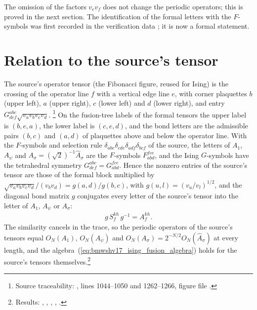 \documentclass{article}
\begin{document}
The omission of the factors $v_ev_f$ does not change the periodic
operators; this is proved in the next section. The identification of the
formal letters with the $F$-symbols was first recorded in the verification
data ; it is now
a formal statement.

\section{Relation to the source's tensor}

The source's operator tensor (the Fibonacci figure, reused for Ising) is the
crossing of the operator line $f$ with a vertical edge line $e$, with corner
plaquettes $b$ (upper left), $a$ (upper right), $c$ (lower left) and $d$
(lower right), and entry $G^{abc}_{def}\sqrt{v_av_bv_cv_d}$.%
\footnote{Source traceability:
    , lines 1044--1050 and
    1262--1266, figure file .}
On the fusion-tree labels of the formal tensors the upper label is
$(b,e,a)$, the lower label is $(c,e,d)$, and the bond letters are the
admissible pairs $(b,c)$ and $(a,d)$ of plaquettes above and below the
operator line. With the $F$-symbols and selection rule
$\delta_{abe}\delta_{cde}\delta_{adf}\delta_{bcf}$ of the source, the letters
of $A_1$, $A_\psi$ and $A_\sigma=(\sqrt2)^{-1}\widehat A_\sigma$ are the
$F$-symbols $F^{fce}_{abd}$, and the Ising $G$-symbols have the tetrahedral
symmetry $G^{abc}_{def}=G^{fce}_{abd}$. Hence the nonzero entries of the
source's tensor are those of the formal block multiplied by
$\sqrt{v_av_bv_cv_d}/(v_bv_d)=g(a,d)/g(b,c)$, with $g(u,l)=(v_u/v_l)^{1/2}$,
and the diagonal bond matrix $g$ conjugates every letter of the source's
tensor into the letter of $A_1$, $A_\psi$ or $A_\sigma$:
\begin{align}
    g\,S_f^{kh}\,g^{-1} = A_f^{kh}.
    \label{eq:bmwshv17_ising_gsymbol_conj}
\end{align}
The similarity cancels in the trace, so the periodic operators of the
source's tensors equal $O_N(A_1)$, $O_N(A_\psi)$ and
$O_N(A_\sigma)=2^{-N/2}O_N(\widehat A_\sigma)$ at every length, and the
algebra~(\ref{eq:bmwshv17_ising_fusion_algebra}) holds for the source's
tensors themselves.\footnote{Results:
    ,
    ,
    ,
    ,
    .}
\end{document}
